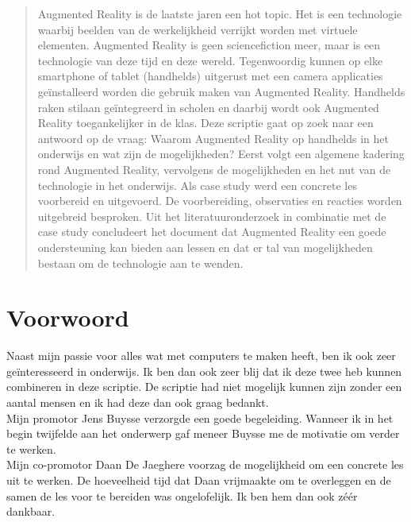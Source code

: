 \documentclass[pdftex,a4paper,12pt,twoside]{report}
\begin{document}
\begin{abstract}
Augmented Reality is de laatste jaren een hot topic. Het is een technologie waarbij beelden van de werkelijkheid verrijkt worden met virtuele elementen. Augmented Reality is geen sciencefiction meer, maar is een technologie van deze tijd en deze wereld. Tegenwoordig kunnen op elke smartphone of tablet (handhelds) uitgerust met een camera applicaties ge\"installeerd worden die gebruik maken van Augmented Reality. Handhelds raken stilaan ge\"integreerd in scholen en daarbij wordt ook Augmented Reality toegankelijker in de klas. Deze scriptie gaat op zoek naar een antwoord op de vraag: Waarom Augmented Reality op handhelds in het onderwijs en wat zijn de mogelijkheden? Eerst volgt een algemene kadering rond Augmented Reality, vervolgens de mogelijkheden en het nut van de technologie in het onderwijs. Als case study werd een concrete les voorbereid en uitgevoerd. De voorbereiding, observaties en reacties worden uitgebreid besproken. Uit het literatuuronderzoek in combinatie met de case study concludeert het document dat Augmented Reality een goede ondersteuning kan bieden aan lessen en dat er tal van mogelijkheden bestaan om de technologie aan te wenden.   \\

\end{abstract}

\chapter*{Voorwoord}
\label{ch:voorwoord}

Naast mijn passie voor alles wat met computers te maken heeft, ben ik ook zeer ge\"interesseerd in onderwijs. Ik ben dan ook zeer blij dat ik deze twee heb kunnen combineren in deze scriptie. De scriptie had niet mogelijk kunnen zijn zonder een aantal mensen en ik had deze dan ook graag bedankt.\\

Mijn promotor Jens Buysse verzorgde een goede begeleiding. Wanneer ik in het begin twijfelde aan het onderwerp gaf meneer Buysse me de motivatie om verder te werken. \\

Mijn co-promotor Daan De Jaeghere voorzag de mogelijkheid om een concrete les uit te werken. De hoeveelheid tijd dat Daan vrijmaakte om te overleggen en de samen de les voor te bereiden was ongelofelijk. Ik ben hem dan ook z\'e\'er dankbaar. \\
\end{document}
